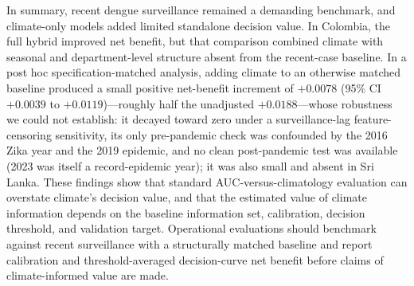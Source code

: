 \documentclass[11pt,a4paper]{article}
\begin{document}
In summary, recent dengue surveillance remained a demanding benchmark, and climate-only models added limited standalone decision value. In Colombia, the full hybrid improved net benefit, but that comparison combined climate with seasonal and department-level structure absent from the recent-case baseline. In a post hoc specification-matched analysis, adding climate to an otherwise matched baseline produced a small positive net-benefit increment of $+0.0078$ (95\% CI $+0.0039$ to $+0.0119$)---roughly half the unadjusted $+0.0188$---whose robustness we could not establish: it decayed toward zero under a surveillance-lag feature-censoring sensitivity, its only pre-pandemic check was confounded by the 2016 Zika year and the 2019 epidemic, and no clean post-pandemic test was available (2023 was itself a record-epidemic year); it was also small and absent in Sri Lanka. These findings show that standard AUC-versus-climatology evaluation can overstate climate's decision value, and that the estimated value of climate information depends on the baseline information set, calibration, decision threshold, and validation target. Operational evaluations should benchmark against recent surveillance with a structurally matched baseline and report calibration and threshold-averaged decision-curve net benefit before claims of climate-informed value are made.

\end{document}
